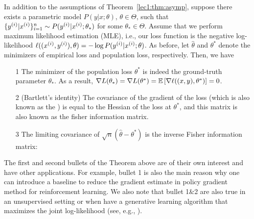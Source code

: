 \begin{theorem}
\label{lec2:thm:applied}
    In addition to the assumptions of Theorem~\ref{lec1:thm:asymp}, suppose there exists a parametric model $P(y \vert x; \theta)$, $\theta \in \Theta$, such that $\{ y\sp{i} \vert x\sp{i} \}_{i=1}^n \sim P( y\sp{i} \vert x\sp{i} ; \theta_*)$ for some $\theta_* \in \Theta$. Assume that we perform maximum likelihood estimation (MLE), i.e., our loss function is the negative log-likelihood $\ell((x\sp{i}, y\sp{i}), \theta) = - \log P( y\sp{i} \vert x\sp{i} ; \theta)$. As before, let $\hat\theta$ and $\theta^*$ denote the minimizers of empirical loss and population loss, respectively. Then, we have
    
    \begin{enumerate}
    	\item[1] The minimizer of the population loss $\theta^*$ is indeed the ground-truth parameter $\theta_*$. As a result, $\nabla L(\theta_*) = \nabla L(\theta^*) = \Exp \left[ \nabla \ell ((x, y), \theta^*) \right] = 0$. 
    	\item[2] (Bartlett's identity) The covariance of the gradient of the loss (which is also known as the ) is equal to the Hessian of the loss at $\theta^*$, and this matrix is also known as the fisher information matrix. 
    \item[3] The limiting covariance of $\sqrt n (\hat \theta - \theta^*)$ is the inverse Fisher information matrix:
     \end{enumerate}

\end{theorem}
The first and second bullets of the Theorem above are of their own interest and have other applications. For example, bullet 1 is also the main reason why one can introduce a baseline to reduce the gradient estimate in policy gradient method for reinforcement learning. We also note that bullet 1\&2 are also true in an unsupervised setting or when have a generative learning algorithm that maximizes the joint log-likelihood (see, e.g., \citep[Section 4]{cs229notes}). 

